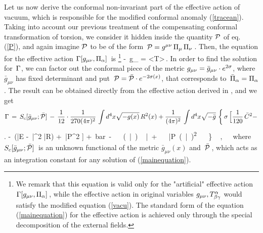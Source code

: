 Let us now derive the 
conformal non-invariant part of the effective action of 
vacuum, which is responsible for the modified conformal 
anomaly (\ref{tracean}). Taking into account our previous
treatment of the compensating conformal transformation of 
torsion, we consider 
it hidden inside the quantity ${\cal P}$ of eq. (\ref{P}),
and again imagine ${\cal P}$ to be of the form
$\,{\cal P}=g^{\mu\nu}\,\Pi_\mu\,\Pi_\nu\,$. Then,
the equation for the effective action
$\Gamma [g_{\mu\nu},\Pi_\alpha]\,$ is
\footnote{We remark that this equation is valid only for
the "artificial" effective action
$\Gamma [g_{\mu\nu},\Pi_\alpha]\,$, while the effective
action in original variables $g_{\mu\nu}, T^\alpha_{\beta\gamma}$
would satisfy the modified equation (\ref{vacu}). The
standard form of the equation (\ref{mainequation})
for the effective action is achieved only through
the special decomposition of the external fields.}
\beq
- \,g_{\mu\nu}  {} = <{\cal T}>\,.
\label{mainequation}
\eeq
In order
to find the solution for $\,\Gamma$, we can factor out the conformal
piece of the metric ${g}_{\mu\nu} = {\bar g}_{\mu\nu}\cdot
e^{2\sigma}$, where ${\bar g}_{\mu\nu}$ has fixed determinant
and put $\,{\cal P} = {\bar {\cal P}}\cdot e^{-2\sigma(x)}$, that
corresponds to $\,{\bar \Pi}_\alpha = \Pi_\alpha$.
The result can be obtained directly from the
effective action derived in \cite{buodsh}, and we get
$$
{\Gamma}\, = \,S_c[{\bar g}_{\mu\nu}; {\bar {\cal P}}]
\,- \,\frac{1}{12}\cdot\frac{1}{270 (4\pi)^2}\,\int d^4 x
\sqrt{-g (x)}\,R^2(x) + \frac{1}{(4\pi)^2}\,
\int d^4 x\sqrt{-{\bar g}}\,\left\{
\,\sigma\, \Big[ \frac{1}{120}\,{\bar C}^2 -
\right.
$$
\beq
\left.
- \,({\bar E} - \,{\bar \na}^2 {\bar R})
+ \,{\bar {\cal P}}^2 ] +
 \,\si {\bar \De}\si
-\,({\bar \na}_\mu\si)\,{\bar \na}^
+\,{\bar {\cal P}}({\bar \na}_\mu\si)^2\,\right\}\,,
\label{efac-conforma}
\eeq
where $S_c[{\bar g}_{\mu\nu}; {\bar {\cal P}}]\,$ is an unknown
functional of the metric  ${\bar g}_{\mu\nu}(x)$ and 
$\,{\bar {\cal P}}\,$,
which acts as an integration constant for any solution of
(\ref{mainequation}).

